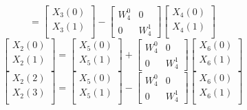 \documentclass[journal,12pt,twocolumn]{IEEEtran}
\renewcommand\thesection{\arabic{section}}
\begin{document}
\begin{enumerate}[label=\thesection.\arabic*.,ref=\thesection.\theenumi]
\begin{equation}
=
\begin{bmatrix}
X_{3}(0) \\ 
X_{3}(1)\\ 
\end{bmatrix}
-
\begin{bmatrix}
W^{0}_{4} & 0\\
0 & W^{1}_{4}
\end{bmatrix}
\begin{bmatrix}
X_{4}(0) \\ 
X_{4}(1) \\ 
\end{bmatrix}
\label{eq:4-1-low}
\end{equation}
\begin{equation}
\begin{bmatrix}
X_{2}(0) \\ 
X_{2}(1)\\ 
\end{bmatrix}
=
\begin{bmatrix}
X_{5}(0) \\ 
X_{5}(1)\\ 
\end{bmatrix}
+
\begin{bmatrix}
W^{0}_{4} & 0\\
0 & W^{1}_{4}
\end{bmatrix}
\begin{bmatrix}
X_{6}(0) \\ 
X_{6}(1) \\ 
\end{bmatrix}
\label{eq:4-2-high}
\end{equation}
\begin{equation}
\begin{bmatrix}
X_{2}(2) \\ 
X_{2}(3)\\ 
\end{bmatrix}
=
\begin{bmatrix}
X_{5}(0) \\ 
X_{5}(1)\\ 
\end{bmatrix}
-
\begin{bmatrix}
W^{0}_{4} & 0\\
0 & W^{1}_{4}
\end{bmatrix}
\begin{bmatrix}
X_{6}(0) \\ 
X_{6}(1) \\ 
\end{bmatrix}
\label{eq:4-2-low}
\end{equation}

\end{enumerate}
\end{document}
